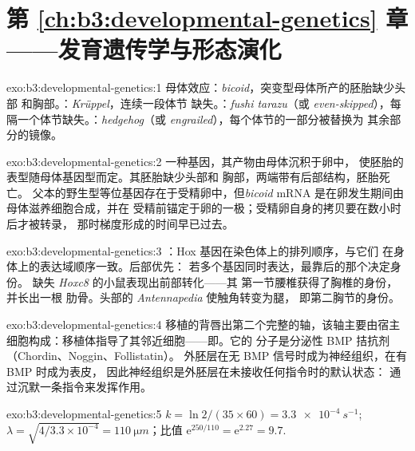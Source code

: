 \section*{第 \ref{ch:b3:developmental-genetics} 章——发育遗传学与形态演化}

\begin{solution}{exo:b3:developmental-genetics:1}
母体效应：\emph{bicoid}，突变型母体所产的胚胎缺少头部
和胸部。：\emph{Krüppel}，连续一段体节
缺失。：\emph{fushi tarazu}（或 \emph{even-skipped}），每
隔一个体节缺失。：\emph{hedgehog}（或
\emph{engrailed}），每个体节的一部分被替换为
其余部分的镜像。
\end{solution}

\begin{solution}{exo:b3:developmental-genetics:2}
一种基因，其产物由母体沉积于卵中，
使胚胎的表型随母体基因型而定。其胚胎缺少头部和
胸部，两端带有后部结构，胚胎死亡。
父本的野生型等位基因存在于受精卵中，但\emph{bicoid} mRNA
是在卵发生期间由母体滋养细胞合成，并在
受精前锚定于卵的一极；受精卵自身的拷贝要在数小时后才被转录，
那时梯度形成的时间早已过去。
\end{solution}

\begin{solution}{exo:b3:developmental-genetics:3}
：Hox 基因在染色体上的排列顺序，与它们
在身体上的表达域顺序一致。后部优先：
若多个基因同时表达，最靠后的那个决定身份。
缺失 \emph{Hoxc8} 的小鼠表现出前部转化——其
第一节腰椎获得了胸椎的身份，并长出一根
肋骨。头部的 \emph{Antennapedia} 使触角转变为腿，
即第二胸节的身份。
\end{solution}

\begin{solution}{exo:b3:developmental-genetics:4}
移植的背唇出第二个完整的轴，该轴主要由宿主
细胞构成：移植体指导了其邻近细胞——即。它的
分子是分泌性 BMP 拮抗剂（Chordin、Noggin、Follistatin）。
外胚层在无 BMP 信号时成为神经组织，在有 BMP 时成为表皮，
因此神经组织是外胚层在未接收任何指令时的默认状态：
通过沉默一条指令来发挥作用。
\end{solution}

\begin{solution}{exo:b3:developmental-genetics:5}
$k = \ln 2/(35\times 60) = \qty{3.3e-4}{s^{-1}}$; $\lambda = \sqrt{4/
3.3\times 10^{-4}} = \qty{110}{\micro m}$；比值 $\mathrm{e}^{250/110}
= \mathrm{e}^{2.27} = 9.7$.
\end{solution}

